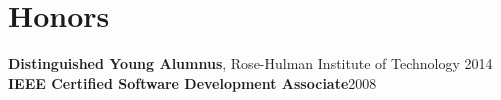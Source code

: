 \section{Honors}

{\bf Distinguished Young Alumnus}, Rose-Hulman Institute of Technology \hfill 2014\\
{\bf IEEE Certified Software Development Associate}\hfill 2008
